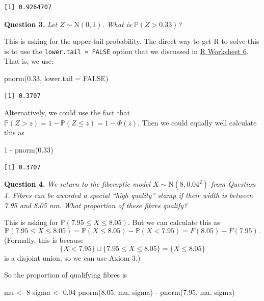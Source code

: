 \documentclass[
  a4paper,
]{book}
\newenvironment{Shaded}{\begin{snugshade}}{\end{snugshade}}
\newcommand{\AttributeTok}[1]{\textcolor[rgb]{0.77,0.63,0.00}{#1}}
\newcommand{\ConstantTok}[1]{\textcolor[rgb]{0.00,0.00,0.00}{#1}}
\newcommand{\DecValTok}[1]{\textcolor[rgb]{0.00,0.00,0.81}{#1}}
\newcommand{\FloatTok}[1]{\textcolor[rgb]{0.00,0.00,0.81}{#1}}
\newcommand{\FunctionTok}[1]{\textcolor[rgb]{0.00,0.00,0.00}{#1}}
\newcommand{\NormalTok}[1]{#1}
\newcommand{\OtherTok}[1]{\textcolor[rgb]{0.56,0.35,0.01}{#1}}
\newcommand{\SpecialCharTok}[1]{\textcolor[rgb]{0.00,0.00,0.00}{#1}}
\theoremstyle{definition}
\theoremstyle{definition}
\theoremstyle{definition}
\theoremstyle{definition}
\theoremstyle{remark}
\begin{document}
\begin{verbatim}
[1] 0.9264707
\end{verbatim}

\textbf{Question 3.} \emph{Let \(Z \sim \mathrm{N}(0,1)\). What is \(\mathbb P(Z > 0.33)\)?}

This is asking for the upper-tail probability. The direct way to get R to solve this is to use the \texttt{lower.tail\ =\ FALSE} option that we discussed in \protect\hyperlink{r}{R Worksheet 6}. That is, we use:

\begin{Shaded}
\begin{Highlighting}[]
\FunctionTok{pnorm}\NormalTok{(}\FloatTok{0.33}\NormalTok{, }\AttributeTok{lower.tail =} \ConstantTok{FALSE}\NormalTok{)}
\end{Highlighting}
\end{Shaded}

\begin{verbatim}
[1] 0.3707
\end{verbatim}

Alternatively, we could use the fact that \(\mathbb P(Z > z) = 1 - \mathbb P(Z \leq z) = 1 - \Phi(z)\). Then we could equally well calculate this as

\begin{Shaded}
\begin{Highlighting}[]
\DecValTok{1} \SpecialCharTok{{-}} \FunctionTok{pnorm}\NormalTok{(}\FloatTok{0.33}\NormalTok{)}
\end{Highlighting}
\end{Shaded}

\begin{verbatim}
[1] 0.3707
\end{verbatim}

\textbf{Question 4.} \emph{We return to the fiberoptic model \(X \sim \mathrm{N}(8, 0.04^2)\) from Question 1. Fibres can be awarded a special ``high quality'' stamp if their width is between 7.95 and 8.05 nm. What proportion of these fibres qualify?}

This is asking for \(\mathbb P(7.95 \leq X \leq 8.05)\). But we can calculate this as
\[ \mathbb P(7.95 \leq X \leq 8.05) = \mathbb P(X \leq 8.05) - \mathbb P(X < 7.95) = F(8.05) - F(7.95) .\]
(Formally, this is because
\[ \{X < 7.95\} \cup \{7.95 \leq X \leq 8.05\} = \{X \leq 8.05\} \]
is a disjoint union, so we can use Axiom 3.)

So the proportion of qualifying fibres is

\begin{Shaded}
\begin{Highlighting}[]
\NormalTok{mu }\OtherTok{\textless{}{-}} \DecValTok{8}
\NormalTok{sigma }\OtherTok{\textless{}{-}} \FloatTok{0.04}
\FunctionTok{pnorm}\NormalTok{(}\FloatTok{8.05}\NormalTok{, mu, sigma) }\SpecialCharTok{{-}} \FunctionTok{pnorm}\NormalTok{(}\FloatTok{7.95}\NormalTok{, mu, sigma)}
\end{Highlighting}
\end{Shaded}
\end{document}
